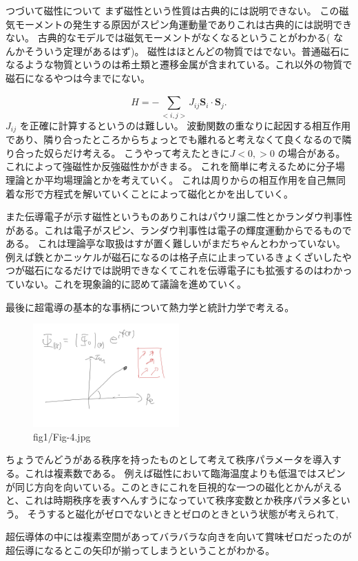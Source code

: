 \documentclass[dvipdfmx]{jsarticle}
\begin{document}
つづいて磁性について
まず磁性という性質は古典的には説明できない。
この磁気モーメントの発生する原因がスピン角運動量でありこれは古典的には説明できない。
古典的なモデルでは磁気モーメントがなくなるということがわかる( なんかそういう定理があるはず)。
磁性はほとんどの物質ではでない。普通磁石になるような物質というのは希土類と遷移金属が含まれている。これ以外の物質で磁石になるやつは今までにない。

\[
H=-\sum_{<i,j>}^{}J_{ij} \bm{S}_i\cdot \bm{S}_j
.\] 
$J_{ij}$ を正確に計算するというのは難しい。
波動関数の重なりに起因する相互作用であり、隣り合ったところからちょっとでも離れると考えなくて良くなるので隣り合った奴らだけ考える。
こうやって考えたときに$J<0,>0$ の場合がある。
これによって強磁性か反強磁性かがきまる。
これを簡単に考えるために分子場理論とか平均場理論とかを考えていく。
これは周りからの相互作用を自己無同着な形で方程式を解いていくことによって磁化とかを出していく。

また伝導電子が示す磁性というものありこれはパウリ譲二性とかランダウ判事性がある。これは電子がスピン、ランダウ判事性は電子の輝度運動からでるものである。
これは理論亭な取扱はすが置く難しいがまだちゃんとわかっていない。
例えば鉄とかニッケルが磁石になるのは格子点に止まっているきょくざいしたやつが磁石になるだけでは説明できなくてこれを伝導電子にも拡張するのはわかっていない。これを現象論的に認めて議論を進めていく。


最後に超電導の基本的な事柄について熱力学と統計力学で考える。
\begin{figure}[H]
	\centering
	\includegraphics[width=0.5\textwidth]{fig1/Fig-4.jpg}
	\caption{fig1/Fig-4.jpg}
	\label{fig:fig1-Fig-4-jpg}
\end{figure}
ちょうでんどうがある秩序を持ったものとして考えて秩序パラメータを導入する。これは複素数である。
例えば磁性において臨海温度よりも低温ではスピンが同じ方向を向いている。このときにこれを巨視的な一つの磁化とかんがえると、これは時期秩序を表すへんすうになっていて秩序変数とか秩序パラメ多という。
そうすると磁化がゼロでないときとゼロのときという状態が考えられて,

超伝導体の中には複素空間があってバラバラな向きを向いて賞味ゼロだったのが超伝導になるとこの矢印が揃ってしまうということがわかる。
\end{document}
